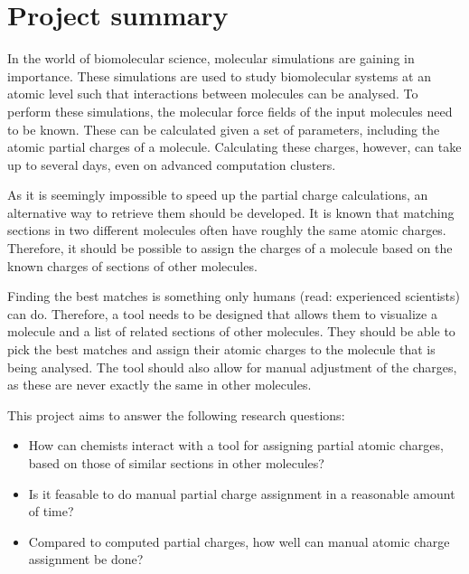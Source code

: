 \chapter{Project summary}

In the world of biomolecular science, molecular simulations are gaining in importance. These simulations are used to study biomolecular systems at an atomic level such that interactions between molecules can be analysed. To perform these simulations, the molecular force fields of the input molecules need to be known. These can be calculated given a set of parameters, including the atomic partial charges of a molecule. Calculating these charges, however, can take up to several days, even on advanced computation clusters.

As it is seemingly impossible to speed up the partial charge calculations, an alternative way to retrieve them should be developed. It is known that matching sections in two different molecules often have roughly the same atomic charges. Therefore, it should be possible to assign the charges of a molecule based on the known charges of sections of other molecules.

Finding the best matches is something only humans (read: experienced scientists) can do. Therefore, a tool needs to be designed that allows them to visualize a molecule and a list of related sections of other molecules. They should be able to pick the best matches and assign their atomic charges to the molecule that is being analysed. The tool should also allow for manual adjustment of the charges, as these are never exactly the same in other molecules.

This project aims to answer the following research questions:
\begin{itemize}
\item How can chemists interact with a tool for assigning partial atomic charges, based on those of similar sections in other molecules?
\item Is it feasable to do manual partial charge assignment in a reasonable amount of time?
\item Compared to computed partial charges, how well can manual atomic charge assignment be done?
\end{itemize}
